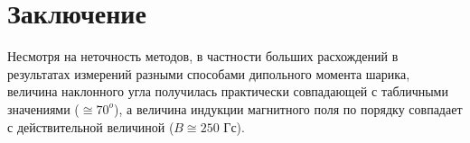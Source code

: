 \section{Заключение}

Несмотря на неточность методов, в частности больших расхождений в результатах измерений разными способами дипольного момента шарика, величина наклонного угла получилась практически совпадающей с табличными значениями ($\cong 70^o$), а величина индукции магнитного поля по порядку совпадает с действительной величиной ($B \cong 250$ Гс).




























